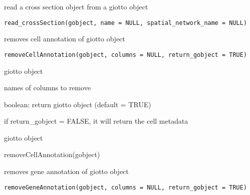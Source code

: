 \documentclass[a4paper]{book}
\begin{document}
%
\begin{Description}\relax
read a cross section object from a giotto object
\end{Description}
%
\begin{Usage}
\begin{verbatim}
read_crossSection(gobject, name = NULL, spatial_network_name = NULL)
\end{verbatim}
\end{Usage}
%
\begin{Description}\relax
removes cell annotation of giotto object
\end{Description}
%
\begin{Usage}
\begin{verbatim}
removeCellAnnotation(gobject, columns = NULL, return_gobject = TRUE)
\end{verbatim}
\end{Usage}
%
\begin{Arguments}
\begin{ldescription}
\item[\code{gobject}] giotto object

\item[\code{columns}] names of columns to remove

\item[\code{return\_gobject}] boolean: return giotto object (default = TRUE)
\end{ldescription}
\end{Arguments}
%
\begin{Details}\relax
if return\_gobject = FALSE, it will return the cell metadata
\end{Details}
%
\begin{Value}
giotto object
\end{Value}
%
\begin{Examples}
\begin{ExampleCode}
    removeCellAnnotation(gobject)
\end{ExampleCode}
\end{Examples}
%
\begin{Description}\relax
removes gene annotation of giotto object
\end{Description}
%
\begin{Usage}
\begin{verbatim}
removeGeneAnnotation(gobject, columns = NULL, return_gobject = TRUE)
\end{verbatim}
\end{Usage}
\end{document}
